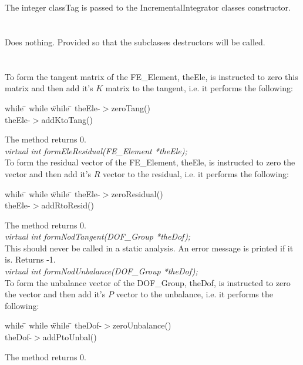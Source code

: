  \\
\\ 
The integer \p classTag is passed to the
IncrementalIntegrator classes constructor. \\

 \\
\\ 
Does nothing. Provided so that the subclasses destructors will be called.\\

\\
 \\
To form the tangent matrix of the FE\_Element, \p theEle, is
instructed to zero this matrix and then add it's $K$ matrix to the
tangent, i.e. it performs the following: 
\begin{tabbing}
while \= \+ while \= while \= \kill
theEle-$>$zeroTang() \\
theEle-$>$addKtoTang() 
\end{tabbing}
\noindent The method returns $0$. \\

{\em virtual int formEleResidual(FE\_Element *theEle);} \\
To form the residual vector of the FE\_Element, \p theEle, is
instructed to zero the vector and then add it's $R$ vector to
the residual, i.e. it performs the following: 
\begin{tabbing}
while \= \+ while \= while \= \kill
theEle-$>$zeroResidual() \\
theEle-$>$addRtoResid() 
\end{tabbing}
\noindent The method returns $0$. \\

{\em virtual int formNodTangent(DOF\_Group *theDof);} \\
This should never be called in a static analysis. An error message is
printed if it is. Returns -1. \\


{\em virtual int formNodUnbalance(DOF\_Group *theDof);} \\
To form the unbalance vector of the DOF\_Group, \p theDof, is
instructed to zero the vector and then add it's $P$ vector to the
unbalance, i.e. it performs the following: 
\begin{tabbing}
while \= \+ while \= while \= \kill
theDof-$>$zeroUnbalance() \\
theDof-$>$addPtoUnbal() 
\end{tabbing}
\noindent The method returns $0$. \\


